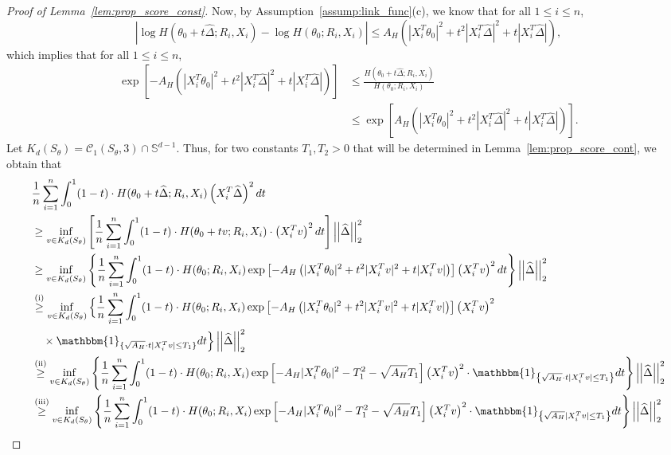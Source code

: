 \documentclass[ejsv2,noshowframe]{imsart}
\theoremstyle{plain}
\theoremstyle{definition}
\theoremstyle{remark}
\newcommand{\norm}[1]{\left|\left| #1 \right|\right|}
\renewcommand{\hat}{\widehat}
\begin{document}
\begin{proof}[Proof of Lemma~\ref{lem:prop_score_const}]
	Now, by Assumption~\ref{assump:link_func}(c), we know that for all $1\leq i\leq n$,
	$$\left|\log H(\theta_0+t\hat{\Delta}; R_i,X_i) - \log H(\theta_0;R_i,X_i) \right| \leq A_H\left(|X_i^T\theta_0|^2 + t^2|X_i^T \hat{\Delta}|^2 + t|X_i^T\hat{\Delta}|\right),$$
	which implies that for all $1\leq i\leq n$,
	\begin{align*}
		\exp\left[-A_H\left(|X_i^T\theta_0|^2 + t^2|X_i^T \hat{\Delta}|^2 + t|X_i^T\hat{\Delta}|\right) \right] &\leq \frac{H(\theta_0+t\hat{\Delta}; R_i,X_i)}{H(\theta_0; R_i,X_i)} \\
		&\leq \exp\left[A_H\left(|X_i^T\theta_0|^2 + t^2|X_i^T \hat{\Delta}|^2 + t|X_i^T\hat{\Delta}|\right) \right].
	\end{align*}
	Let $K_d(S_{\theta}) = \mathcal{C}_1(S_{\theta},3)\cap \mathbb{S}^{d-1}$. Thus, for two constants $T_1,T_2>0$ that will be determined in Lemma~\ref{lem:prop_score_cont}, we obtain that
	{\scriptsize\begin{align*}
			&\frac{1}{n} \sum_{i=1}^n \int_0^1 (1-t) \cdot H(\theta_0+t\hat{\Delta};R_i,X_i) \left(X_i^T\hat{\Delta}\right)^2 dt \\
			&\geq \inf_{v\in K_d(S_{\theta})}\left[\frac{1}{n} \sum_{i=1}^n \int_0^1 (1-t) \cdot H(\theta_0+tv;R_i,X_i) \cdot \left(X_i^Tv\right)^2 dt\right] \norm{\hat{\Delta}}_2^2\\
			&\geq \inf_{v\in K_d(S_{\theta})} \left\{\frac{1}{n} \sum_{i=1}^n \int_0^1 (1-t) \cdot H(\theta_0;R_i,X_i) \exp\left[-A_H\left(|X_i^T\theta_0|^2 + t^2|X_i^T v|^2 + t|X_i^Tv|\right) \right]\left(X_i^Tv\right)^2 dt \right\} \norm{\hat{\Delta}}_2^2\\
			&\stackrel{\text{(i)}}{\geq} \inf_{v\in K_d(S_{\theta})}\Big\{\frac{1}{n} \sum_{i=1}^n \int_0^1 (1-t) \cdot H(\theta_0;R_i,X_i) \exp\left[-A_H\left(|X_i^T\theta_0|^2 + t^2|X_i^T v|^2 + t|X_i^Tv|\right) \right]\left(X_i^Tv\right)^2\\
			&\quad \times \mathbbm{1}_{\{\sqrt{A_H}\cdot t|X_i^T v| \leq T_1\}}dt \Big\} \norm{\hat{\Delta}}_2^2\\
			&\stackrel{\text{(ii)}}{\geq} \inf_{v\in K_d(S_{\theta})}\left\{\frac{1}{n} \sum_{i=1}^n \int_0^1 (1-t) \cdot H(\theta_0;R_i,X_i) \exp\left[-A_H|X_i^T\theta_0|^2 -T_1^2 - \sqrt{A_H}T_1 \right]\left(X_i^Tv\right)^2 \cdot \mathbbm{1}_{\left\{\sqrt{A_H} \cdot t |X_i^T v| \leq T_1 \right\}}dt \right\} \norm{\hat{\Delta}}_2^2\\
			&\stackrel{\text{(iii)}}{\geq} \inf_{v\in K_d(S_{\theta})}\left\{\frac{1}{n} \sum_{i=1}^n \int_0^1 (1-t) \cdot H(\theta_0;R_i,X_i) \exp\left[-A_H|X_i^T\theta_0|^2 -T_1^2 - \sqrt{A_H}T_1 \right]\left(X_i^Tv\right)^2 \cdot \mathbbm{1}_{\left\{\sqrt{A_H} |X_i^T v| \leq T_1\right\}}dt \right\} \norm{\hat{\Delta}}_2^2\\

\end{align*}}
\end{proof}
\end{document}
